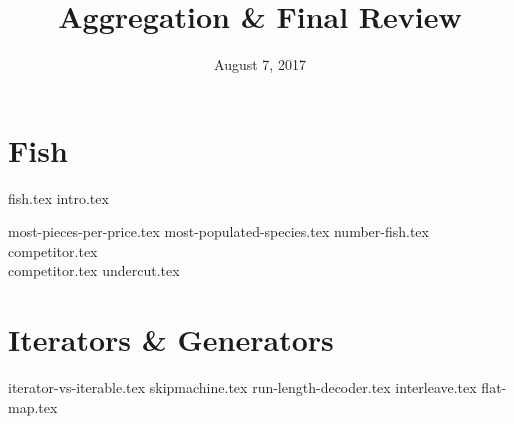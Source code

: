 \documentclass{exam}
\title{Aggregation \& Final Review}
\date{August 7, 2017}
\begin{document}
\maketitle

\lstset{language=SQL}
\section{Fish}
{fish.tex}
{intro.tex}
\begin{questions}
{most-pieces-per-price.tex}
{most-populated-species.tex}
{number-fish.tex}
\clearpage
{competitor.tex}
 \\
{competitor.tex}
{undercut.tex}
\end{questions}

\lstset{language=Python}
\section{Iterators \& Generators}
\begin{questions}
{iterator-vs-iterable.tex}
{skipmachine.tex}
{run-length-decoder.tex}
{interleave.tex}
{flat-map.tex}
\end{questions}
\end{document}
